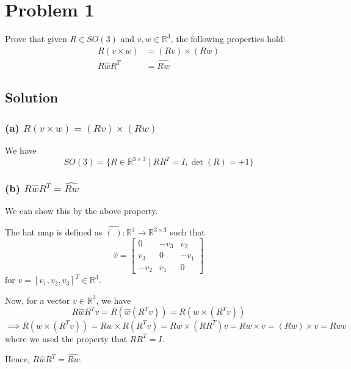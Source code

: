 \section*{Problem 1}

Prove that given \(R \in S O(3)\) and \(v, w \in \mathbb{R}^{3}\), the following properties hold:
\begin{align*}
    R(v \times w)   & =(R v) \times(R w) \\
    R \hat{w} R^{T} & =\widehat{R w}
\end{align*}

\subsection*{Solution}

\subsubsection*{(a) \( R(v \times w) =(R v) \times(R w) \)}

We have
\[
    SO(3) = \{ R \in \mathbb{R}^{3 \times 3} \mid R R^{T} = I, \det(R) = +1 \}
\]


\subsubsection*{(b) \( R \hat{w} R^{T} =\widehat{R w} \)}

We can show this by the above property.

The hat map is defined as \( \hat{(.)}: \mathbb{R}^{3} \rightarrow \mathbb{R}^{3 \times 3} \) such that
\[
    \hat{v} = \begin{bmatrix}
        0      & -v_{3} & v_{2}  \\
        v_{3}  & 0      & -v_{1} \\
        -v_{2} & v_{1}  & 0
    \end{bmatrix}
\]
for \( v = [v_{1}, v_{2}, v_{3}]^{T} \in \mathbb{R}^{3} \).

Now, for a vector \( v \in \mathbb{R}^{3} \), we have
\[
    R \hat{w} R^{T} v
    =
    R (\hat{w} (R^{T} v))
    =
    R (w \times (R^{T} v))
\]
\[
    \implies
    R (w \times (R^{T} v))
    =
    R w \times R(R^{T} v)
    =
    R w \times (RR^{T}) v
    =
    R w \times v
    =
    (R w) \times v
    =
    \widehat{R w} v
\]
where we used the property that \( R R^{T} = I \).

Hence, \( \boxed{ R \hat{w} R^{T} = \widehat{R w} } \).
